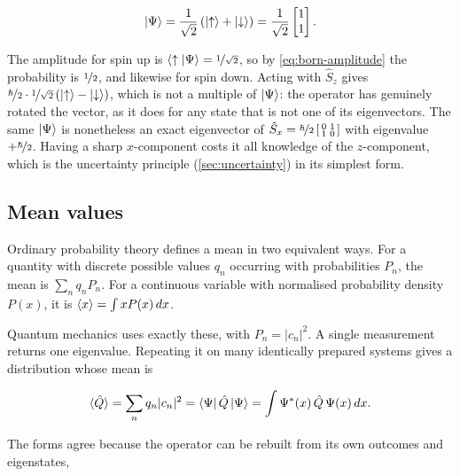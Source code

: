         \begin{equation*}
            \ket{\Psi} = \frac{1}{\sqrt{2}}\left(\ket{\uparrow} + \ket{\downarrow}\right)
            = \frac{1}{\sqrt{2}}\begin{bmatrix} 1 \\ 1 \end{bmatrix}.
        \end{equation*}

        The amplitude for spin up is $\braket{\uparrow|\Psi} = \nicefrac{1}{\sqrt{2}}$, so by \cref{eq:born-amplitude} the probability is $\nicefrac{1}{2}$, and likewise for spin down. Acting with $\hat{S}_{z}$ gives $\nicefrac{\hbar}{2}\cdot\nicefrac{1}{\sqrt{2}}\left(\ket{\uparrow}-\ket{\downarrow}\right)$, which is not a multiple of $\ket{\Psi}$: the operator has genuinely rotated the vector, as it does for any state that is not one of its eigenvectors. The same $\ket{\Psi}$ is nonetheless an exact eigenvector of $\hat{S}_{x} = \nicefrac{\hbar}{2}\left[\begin{smallmatrix} 0 & 1 \\ 1 & 0 \end{smallmatrix}\right]$ with eigenvalue $+\nicefrac{\hbar}{2}$. Having a sharp $x$-component costs it all knowledge of the $z$-component, which is the uncertainty principle (\cref{sec:uncertainty}) in its simplest form.

    \subsection{Mean values}

        Ordinary probability theory defines a mean in two equivalent ways. For a quantity with discrete possible values $q_{n}$ occurring with probabilities $P_{n}$, the mean is $\sum_{n}q_{n}P_{n}$. For a continuous variable with normalised probability density $P(x)$, it is $\langle x \rangle = \int xP(x)\,dx$.

        Quantum mechanics uses exactly these, with $P_{n} = |c_{n}|^{2}$. A single measurement returns one eigenvalue. Repeating it on many identically prepared systems gives a distribution whose mean is

        \begin{equation*}
            \langle \hat{Q} \rangle = \sum_{n}q_{n}|c_{n}|^{2} = \bra{\Psi}\hat{Q}\ket{\Psi} = \int \Psi^{*}(x)\,\hat{Q}\,\Psi(x)\,dx .
        \end{equation*}

        The forms agree because the operator can be rebuilt from its own outcomes and eigenstates,

